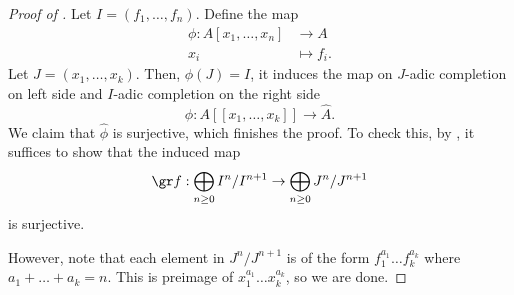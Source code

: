 \begin{proof}[Proof of ]
    Let $I=(f_1,\dots,f_n)$. Define the map
    \begin{align*}
        \phi : A[x_1,\dots,x_n] &\to  A \\
        x_i &\mapsto f_i.
    \end{align*}
    Let $J = (x_1,\dots,x_k)$. Then, $\phi(J)=I$,
    it induces the map on $J$-adic completion
    on left side and $I$-adic completion on the right side
    $$\widehat \phi : A[[x_1,\dots,x_k]] \to \widehat A.$$
    We claim that $\widehat\phi$ is surjective,
    which finishes the proof.
    To check this, by ,
    it suffices to show that the induced map
    $$\gr f : \bigoplus_{n\geq 0} I^n/I^{n+1} \to 
    \bigoplus_{n\geq 0} J^n/J^{n+1}$$
    is surjective.
    
    However, note that each element in $J^n/J^{n+1}$
    is of the form $f_1^{a_1}\dots f_k^{a_k}$
    where $a_1+\dots+a_k=n$.
    This is preimage of $x_1^{a_1}\dots x_k^{a_k}$,
    so we are done.
\end{proof}
